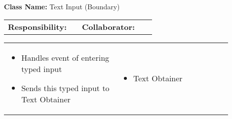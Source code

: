 \begin{cards}[]
    \textbf{Class Name:} Text Input (Boundary)
    \tcbline
    \begin{tabular}{p{0.45\linewidth} | p{0.45\linewidth}}
        \textbf{Responsibility:}& 
        \textbf{Collaborator:}\\
    \end{tabular}
    \tcbline
    \begin{tabular}{p{0.45\linewidth} | p{0.45\linewidth}}
        \begin{itemize}
            \item Handles event of entering typed input
            \item Sends this typed input to Text Obtainer
            
        \end{itemize}
        &
        \begin{itemize}
            \item Text Obtainer
        \end{itemize}
    \end{tabular}
\end{cards}